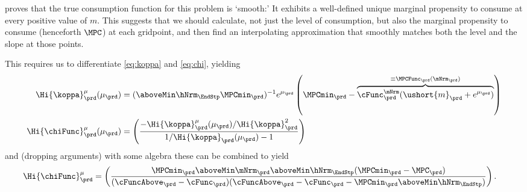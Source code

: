 \documentclass[\econtexRoot/SolvingMicroDSOPs]{subfiles}
\begin{document}
\cite{BufferStockTheory} proves that the true consumption function for
this problem
is `smooth:' It
exhibits a well-defined unique marginal propensity to consume at every
positive value of ${m}$.  This suggests that we should calculate, not
just the level of consumption, but also the marginal propensity to
consume (henceforth $\MPC$) at each gridpoint, and then find an
interpolating approximation that smoothly matches both the level and the slope
at those points.

This requires us to differentiate \eqref{eq:koppa} and \eqref{eq:chi}, yielding
\begin{equation}\begin{gathered}\begin{aligned}
      \Hi{\koppa}_{\prd}^{\mu}(\mu_{\prd})   & = (\aboveMin \hNrm_{\EndStp} \MPCmin_{\prd})^{-1}e^{\mu_{\prd}}\left(\MPCmin_{\prd}-\overbrace{\cFunc^{\mNrm}_{\prd}(\ushort{m}_{\prd}+e^{\mu_{\prd}})}^{\equiv \MPCFunc_{\prd}(\mNrm_{\prd})}\right)  \label{eq:koppaPrime}
      \\ \Hi{\chiFunc}_{\prd}^{\mu}(\mu_{\prd})  & = \left(\frac{-\Hi{\koppa}_{\prd}^{\mu}(\mu_{\prd})/\Hi{\koppa}_{\prd}^{2}}{1/\Hi{\koppa}_{\prd}(\mu_{\prd})-1}\right)
    \end{aligned}\end{gathered}\end{equation}
and (dropping arguments) with some algebra these can be combined to yield
\begin{equation}\begin{gathered}\begin{aligned}
      \Hi{\chiFunc}_{\prd}^{\mu}  & = \left(\frac{\MPCmin_{\prd} \aboveMin \mNrm_{\prd} \aboveMin \hNrm_{\EndStp} (\MPCmin_{\prd}-\MPC_{\prd})}
        {(\cFuncAbove_{\prd}-\cFunc_{\prd})(\cFuncAbove_{\prd}-\cFunc_{\prd} - \MPCmin_{\prd} \aboveMin \hNrm_{\EndStp})}\right).
    \end{aligned}\end{gathered}\end{equation}
\end{document}
